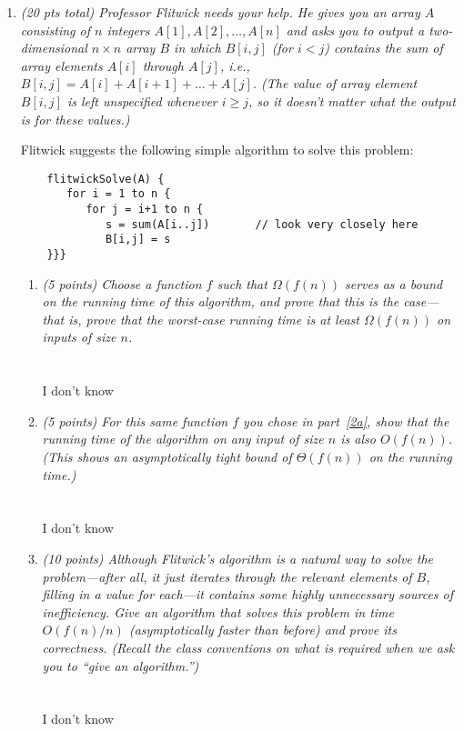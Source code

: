 \documentclass[12pt]{article}
\begin{document}
\begin{enumerate}
	\item {\itshape (20 pts total) Professor Flitwick needs your help. He gives you an array $A$ consisting of $n$ integers $A[1], A[2], \dots , A[n]$ and asks you to output a two-dimensional $n\times n$ array $B$ in which $B[i,j]$ (for $i<j$) contains the sum of array elements $A[i]$ through $A[j]$, i.e., $B[i,j] = A[i]+A[i+1]+\dots+A[j]$. (The value of array element $B[i,j]$ is left unspecified whenever $i\geq j$, so it doesn't matter what the output is for these values.)
	
	Flitwick suggests the following simple algorithm to solve this problem:
	\begin{small}
	\begin{verbatim}
	flitwickSolve(A) {
	   for i = 1 to n {
	      for j = i+1 to n {
	         s = sum(A[i..j])       // look very closely here
	         B[i,j] = s
	}}}
	\end{verbatim}
	\end{small}}
	
	\begin{enumerate}
	\item {\itshape \label{2a} (5 points) Choose a function $f$ such that $\Omega(f(n))$ serves as a bound on the running time of this algorithm, and prove that this is the case---that is, prove that the worst-case running time is at least $\Omega(f(n))$ on inputs of size $n$. }
	\\ \\ \\ I don't know
	\pagebreak	

	\item {\itshape \label{2b} (5 points) For this same function $f$ you chose in part~\ref{2a}, show that the running time of the algorithm on any input of size $n$ is also $O(f(n))$. (This shows an asymptotically tight bound of $\Theta(f(n))$ on the running time.)}
		\\ \\ \\ I don't know
\pagebreak
	
	\item {\itshape \label{2c} (10 points) Although Flitwick's algorithm is a natural way to solve the problem---after all, it just iterates through the relevant elements of $B$, filling in a value for each---it contains some highly unnecessary sources of inefficiency. Give an algorithm that solves this problem in time $O(f(n)/n)$ (asymptotically faster than before) and prove its correctness. (Recall the class conventions on what is required when we ask you to ``give an algorithm.'') }
		\\ \\ \\ I don't know
		\pagebreak
		\end{enumerate}
		

\end{enumerate}
\end{document}
